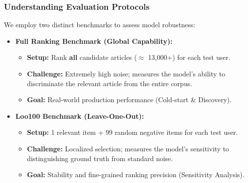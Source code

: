 \documentclass{beamer}
\begin{document}
\begin{frame}
    \frametitle{Understanding Evaluation Protocols}
    We employ two distinct benchmarks to assess model robustness:

    \vspace{0.3cm}
    \begin{itemize}
        \item \textbf{Full Ranking Benchmark (Global Capability):}
              \begin{itemize}
                  \item \textbf{Setup:} Rank \textbf{all} candidate articles ($\approx$ 13,000+) for each test user.
                  \item \textbf{Challenge:} Extremely high noise; measures the model's ability to discriminate the relevant article from the entire corpus.
                  \item \textbf{Goal:} Real-world production performance (Cold-start \& Discovery).
              \end{itemize}
        \item \textbf{Loo100 Benchmark (Leave-One-Out):}
              \begin{itemize}
                  \item \textbf{Setup:} 1 relevant item + 99 random negative items for each test user.
                  \item \textbf{Challenge:} Localized selection; measures the model's sensitivity to distinguishing ground truth from standard noise.
                  \item \textbf{Goal:} Stability and fine-grained ranking precision (Sensitivity Analysis).
              \end{itemize}
    \end{itemize}
\end{frame}
\end{document}
